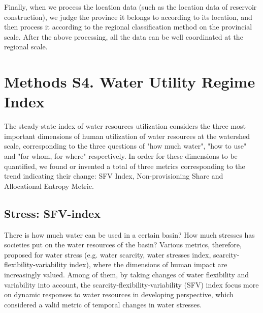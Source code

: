 \documentclass[9pt,twoside,lineno]{pnas-new}
\begin{document}
Finally, when we process the location data (such as the location data of reservoir construction), we judge the province it belongs to according to its location, and then process it according to the regional classification method on the provincial scale. After the above processing, all the data can be well coordinated at the regional scale.

\newpage
\section*{Methods S4. Water Utility Regime Index}
The steady-state index of water resources utilization considers the three most important dimensions of human utilization of water resources at the watershed scale, corresponding to the three questions of "how much water", "how to use" and "for whom, for where" respectively. 
In order for these dimensions to be quantified, we found or invented a total of three metrics corresponding to the trend indicating their change: SFV Index, Non-provisioning Share and Allocational Entropy Metric.

\subsection*{Stress: SFV-index}
	There is how much water can be used in a certain basin? How much stresses has societies put on the water resources of the basin? Various metrics, therefore, proposed for water stress (e.g. water scarcity, water stresses index, scarcity-flexibility-variability index), where the dimensions of human impact are increasingly valued.
    Among of them, by taking changes of water flexibility and variability into account,	the scarcity-flexibility-variability (SFV) index focus more on dynamic responses to water resources in developing perspective, which considered a valid metric of temporal changes in water stresses.
    
\end{document}
